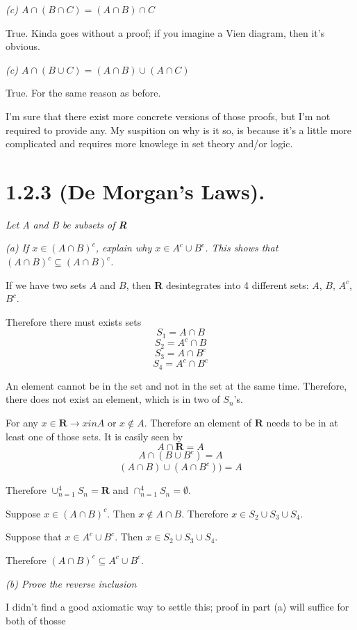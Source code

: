 \documentclass[11pt,oneside,titlepage]{article}
\begin{document}
\textit{(c) $A \cap (B \cap C) = (A \cap B) \cap C$}

True. Kinda goes without a proof; if you imagine a Vien diagram, then it's
obvious.

\textit{(c) $A \cap (B \cup C) = (A \cap B)  \cup (A \cap C)$}

True. For the same reason as before.

I'm sure that there exist more concrete versions of those proofs, but I'm not
required to provide any. My suspition on why is it so, is because it's a
little more complicated and requires more knowlege in set theory and/or logic.

\section*{1.2.3 (De Morgan's Laws).}

\textit{Let A and B be subsets of \textbf{R}}

\textit{(a) If $x \in (A \cap B)^c$, explain why $x \in A^c \cup B^c$. This
  shows that $(A \cap B)^c \subseteq (A \cap B)^c$.}

If we have two sets $A$ and $B$, then \textbf{R} desintegrates into 4 different
sets: $A$, $B$, $A^c$, $B^c$.

Therefore there must exists sets
$$S_1 = A \cap B$$
$$S_2 = A^c \cap B$$
$$S_3 = A \cap B^c$$
$$S_4 = A^c \cap B^c$$

An element cannot be in the set and not in the set at the same time. Therefore,
there does not exist an element, which is in two of $S_n$'s.

For any $x \in \textbf{R} \to x in A$ or $x \notin A$. Therefore an element
of $\textbf{R}$ needs to be in at least one of those sets. It is easily seen by
$$A \cap \textbf{R} = A$$
$$A \cap (B \cup B^c) = A$$
$$(A \cap B) \cup (A \cap B^c)) = A$$

Therefore $\cup_{n = 1}^4 S_n = \textbf{R}$ and
$\cap_{n = 1}^4 S_n = \emptyset$.

Suppose $x \in (A \cap B)^c$. Then $x \notin A \cap B$. Therefore
$x \in S_2 \cup S_3 \cup S_4$.

Suppose that $x \in A^c \cup B^c$. Then $x \in S_2 \cup S_3 \cup S_4$.

Therefore $ (A \cap B)^c \subseteq A^c \cup B^c$.

\textit{(b) Prove the reverse inclusion}

I didn't find a good axiomatic way to settle this; proof in part (a)
will suffice for both of thosse
\end{document}
